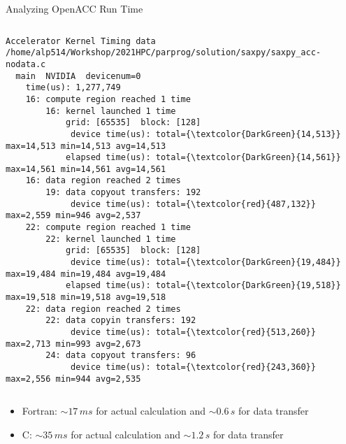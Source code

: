 \documentclass[10pt,t]{beamer}
\begin{document}
\begin{frame}[fragile]{Analyzing OpenACC Run Time}
\begin{block}{}
\begin{columns}[t]
\begin{Verbatim}[fontsize=\fontsize{3.5}{4.5}\selectfont,commandchars=\\\{\}]
Accelerator Kernel Timing data
/home/alp514/Workshop/2021HPC/parprog/solution/saxpy/saxpy_acc-nodata.c
  main  NVIDIA  devicenum=0
    time(us): 1,277,749
    16: compute region reached 1 time
        16: kernel launched 1 time
            grid: [65535]  block: [128]
             device time(us): total={\textcolor{DarkGreen}{14,513}} max=14,513 min=14,513 avg=14,513
            elapsed time(us): total={\textcolor{DarkGreen}{14,561}} max=14,561 min=14,561 avg=14,561
    16: data region reached 2 times
        19: data copyout transfers: 192
             device time(us): total={\textcolor{red}{487,132}} max=2,559 min=946 avg=2,537
    22: compute region reached 1 time
        22: kernel launched 1 time
            grid: [65535]  block: [128]
             device time(us): total={\textcolor{DarkGreen}{19,484}} max=19,484 min=19,484 avg=19,484
            elapsed time(us): total={\textcolor{DarkGreen}{19,518}} max=19,518 min=19,518 avg=19,518
    22: data region reached 2 times
        22: data copyin transfers: 192
             device time(us): total={\textcolor{red}{513,260}} max=2,713 min=993 avg=2,673
        24: data copyout transfers: 96
             device time(us): total={\textcolor{red}{243,360}} max=2,556 min=944 avg=2,535
    \end{Verbatim}
    \end{columns}
  \end{block}
  \begin{itemize}
    \item Fortran: $\sim17\,ms$ for actual calculation and $\sim0.6\,s$ for data transfer
    \item C: $\sim35\,ms$ for actual calculation and $\sim1.2\,s$ for data transfer
  \end{itemize}
\end{frame}
\end{document}
